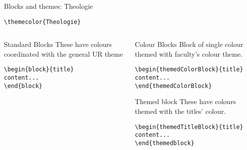 \begingroup
{}
\begin{frame}[fragile]{Blocks and themes: Theologie}
    \begin{center}\verb|\themecolor{Theologie}|\end{center}
\begin{columns} %
\begin{column}{0.3\textwidth}
\begin{block}{Standard Blocks}
These have colours coordinated with the general UR theme
\begin{verbatim}
\begin{block}{title}
content...
\end{block}
\end{verbatim}
\end{block}
\end{column}
\begin{column}{0.7\textwidth}
\begin{themedColorBlock}{Colour Blocks}
Block of single colour themed with faculty's colour theme.
\small
\begin{verbatim}
\begin{themedColorBlock}{title}
content...
\end{themedColorBlock}
\end{verbatim}
\end{themedColorBlock}
\begin{themedTitleBlock} {Themed block}
These have colours themed with the titles' colour.
\small
\begin{verbatim}
\begin{themedTitleBlock}{title}
content...
\end{themedblock}
\end{verbatim}
\end{themedTitleBlock}
\end{column}
\end{columns}
\end{frame}
\endgroup


